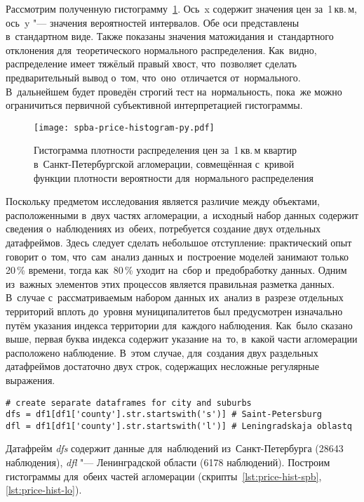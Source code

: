\documentclass[]{scrreprt}
\begin{document}
Рассмотрим полученную гистограмму~\ref{fig:spba-prices-hist}. Ось~x содержит значения цен за~1\,кв.\,м, ось~y "--- значения вероятностей интервалов. Обе оси представлены в~стандартном виде. Также показаны значения матожидания и~стандартного отклонения для~теоретического нормального распределения. Как~видно, распределение имеет тяжёлый правый хвост, что~позволяет сделать предварительный вывод о~том, что~оно~отличается от~нормального. В~дальнейшем будет проведён строгий тест на~нормальность, пока~же можно ограничиться первичной субъективной интерпретацией гистограммы.
%
\begin{figure}[ht]
	\centering
	\texttt{[image: spba-price-histogram-py.pdf]}
	\caption{Гистограмма плотности распределения цен за~1\,кв.\,м квартир в~Санкт-Петербургской агломерации, совмещённая с~кривой функции плотности вероятности для~нормального распределения}
	\label{fig:spba-prices-hist}
\end{figure}
%
Поскольку предметом исследования является различие между объектами, расположенными в~двух частях агломерации, а~исходный набор данных содержит сведения о~наблюдениях из~обеих, потребуется создание двух отдельных датафреймов. Здесь следует сделать небольшое отступление: практический опыт говорит о~том, что~сам~анализ данных и~построение моделей занимают только 20\,\% времени, тогда как~80\,\% уходит на~сбор и~предобработку данных. Одним из~важных элементов этих процессов является правильная разметка данных. В~случае с~рассматриваемым набором данных их~анализ в~разрезе отдельных территорий вплоть до~уровня муниципалитетов был предусмотрен изначально путём указания индекса территории для~каждого наблюдения. Как~было сказано выше, первая буква индекса содержит указание на~то, в~какой части агломерации расположено наблюдение. В~этом случае, для~создания двух раздельных датафреймов достаточно двух строк, содержащих несложные регулярные выражения.
%
\begin{lstlisting}[float, caption = Создание отдельных датафреймов для~Санкт-Петербурга и~Ленинградской области, firstnumber=1, label= lst:create-two-separate-df-for-S-Pb-LO]
# create separate dataframes for city and suburbs
dfs = df1[df1['county'].str.startswith('s')] # Saint-Petersburg
dfl = df1[df1['county'].str.startswith('l')] # Leningradskaja oblastq
\end{lstlisting}
%
Датафрейм \emph{dfs} содержит данные для~наблюдений из~Санкт-Петербурга (28643 наблюдения), \emph{dfl} "--- Ленинградской области (6178 наблюдений). Построим гистограммы для~обеих частей агломерации (скрипты~\ref{lst:price-hist-spb}, \ref{lst:price-hist-lo}).
\end{document}
